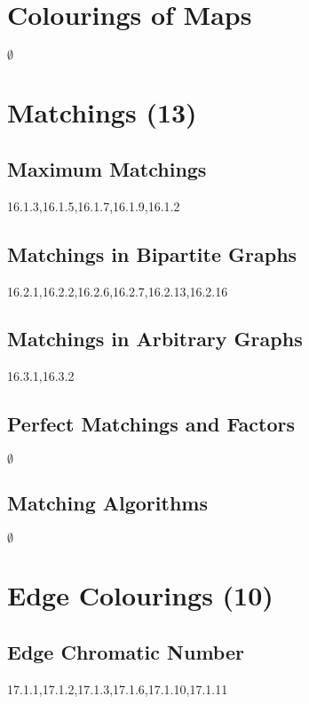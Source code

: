 \documentclass[12pt]{article}
\begin{document}
\newpage

\section{Colourings of Maps}


$\emptyset$

\section{Matchings (13)}

\subsection{Maximum Matchings}

16.1.3,16.1.5,16.1.7,16.1.9,16.1.2

\subsection{Matchings in Bipartite Graphs}

16.2.1,16.2.2,16.2.6,16.2.7,16.2.13,16.2.16


\subsection{Matchings in Arbitrary Graphs}

16.3.1,16.3.2

\subsection{Perfect Matchings and Factors}

$\emptyset$

\subsection{Matching Algorithms}

$\emptyset$

\newpage

\section{Edge Colourings (10)}

\subsection{Edge Chromatic Number}

17.1.1,17.1.2,17.1.3,17.1.6,17.1.10,17.1.11
\end{document}

